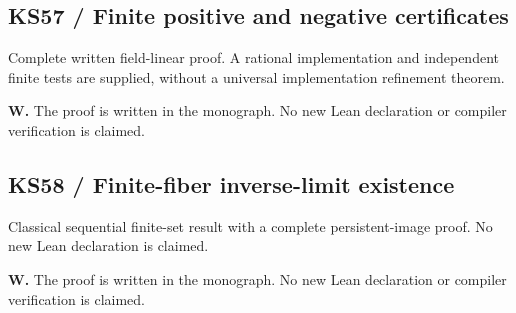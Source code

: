 \par\noindent\begin{minipage}{\linewidth}\subsection*{KS57 / Finite positive and negative certificates}
Complete written field-linear proof. A rational implementation and independent finite tests are supplied, without a universal implementation refinement theorem.
\par\smallskip\noindent\textbf{W.} The proof is written in the monograph. No new Lean declaration or compiler verification is claimed.
\smallskip\noindent{\color{KomorebiMuted}\rule{\linewidth}{.3pt}}\par\end{minipage}\par\medskip
{}
\par\noindent\begin{minipage}{\linewidth}\subsection*{KS58 / Finite-fiber inverse-limit existence}
Classical sequential finite-set result with a complete persistent-image proof. No new Lean declaration is claimed.
\par\smallskip\noindent\textbf{W.} The proof is written in the monograph. No new Lean declaration or compiler verification is claimed.
\smallskip\noindent{\color{KomorebiMuted}\rule{\linewidth}{.3pt}}\par\end{minipage}\par\medskip
